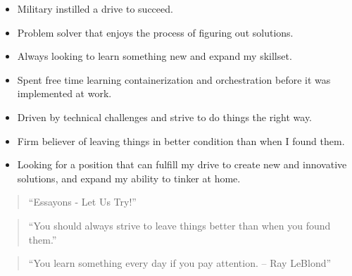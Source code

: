 \documentclass[10pt,a4paper,ragged2e,withhyper]{altacv}
\begin{document}
\begin{paracol}{2}
\medskip


\begin{itemize}
\item Military instilled a drive to succeed. 
\item Problem solver that enjoys the process of figuring out solutions. 
\item Always looking to learn something new and expand my skillset.
\item Spent free time learning containerization and orchestration before it was implemented at work.
\item Driven by technical challenges and strive to do things the right way. 
\item Firm believer of leaving things in better condition than when I found them. 
\item Looking for a position that can fulfill my drive to create new and innovative solutions, and expand my ability to tinker at home.
\end{itemize}

\switchcolumn


\begin{quote}
  ``Essayons - Let Us Try!''
  \end{quote}  

  \divider

\begin{quote}
``You should always strive to leave things better than when you found them.''
\end{quote}

\divider

\begin{quote}
  ``You learn something every day if you pay attention. -- Ray LeBlond''
  \end{quote}



\divider


\divider




\end{paracol}
\end{document}
